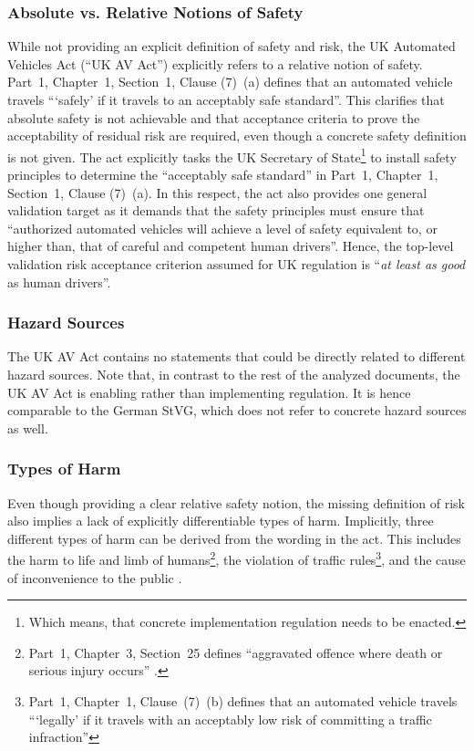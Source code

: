 \subsubsection{Absolute vs. Relative Notions of Safety}
While not providing an explicit definition of safety and risk, the UK Automated Vehicles Act (``UK AV Act'') \parencite{ukav2024} explicitly refers to a relative notion of safety.
Part~1, Chapter~1, Section~1, Clause (7)~(a) defines that an automated vehicle travels ```safely' if it travels to an acceptably safe standard''.
This clarifies that absolute safety is not achievable and that acceptance criteria to prove the acceptability of residual risk are required, even though a concrete safety definition is not given.
The act explicitly tasks the UK Secretary of State\footnote{Which means, that concrete implementation regulation needs to be enacted.} to install safety principles to determine the ``acceptably safe standard'' in Part~1, Chapter~1, Section~1, Clause (7)~(a).
In this respect, the act also provides one general validation target as it demands that the safety principles must ensure that ``authorized automated vehicles will achieve a level of safety equivalent to, or higher than, that of careful and competent human drivers''.
Hence, the top-level validation risk acceptance criterion assumed for UK regulation is ``\emph{at least as good} as human drivers''.

\subsubsection{Hazard Sources}
The UK AV Act contains no statements that could be directly related to different hazard sources.
Note that, in contrast to the rest of the analyzed documents, the UK AV Act is enabling rather than implementing regulation.
It is hence comparable to the German StVG, which does not refer to concrete hazard sources as well.

\subsubsection{Types of Harm}
Even though providing a clear relative safety notion, the missing definition of risk also implies a lack of explicitly differentiable types of harm.
Implicitly, three different types of harm can be derived from the wording in the act.
This includes the harm to life and limb of humans\footnote{Part~1, Chapter~3, Section~25 defines ``aggravated offence where death or serious injury occurs'' \parencite{ukav2024}.}, the violation of traffic rules\footnote{Part~1, Chapter~1, Clause~(7)~(b) defines that an automated vehicle travels ```legally' if it travels with an acceptably low risk of committing a traffic infraction''}, and the cause of inconvenience to the public \parencite[Part~1, Chapter~1, Section~58, Clause (2)~(d)]{ukav2024}.

